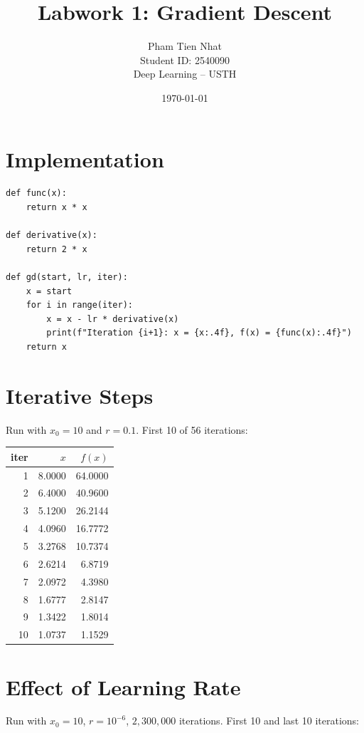 \documentclass[11pt,a4paper]{article}
\title{Labwork 1: Gradient Descent}
\author{Pham Tien Nhat \\ Student ID: 2540090 \\ Deep Learning -- USTH}
\date{\today}
\begin{document}
\maketitle

\section{Implementation}

\begin{verbatim}
def func(x):
    return x * x

def derivative(x):
    return 2 * x

def gd(start, lr, iter):
    x = start
    for i in range(iter):
        x = x - lr * derivative(x)
        print(f"Iteration {i+1}: x = {x:.4f}, f(x) = {func(x):.4f}")
    return x
\end{verbatim}

\section{Iterative Steps}
Run with $x_0=10$ and $r=0.1$. First 10 of 56 iterations:

\begin{table}[H]
\centering
\begin{tabular}{rrr}
\toprule
iter & $x$ & $f(x)$ \\
\midrule
1  & 8.0000 & 64.0000 \\
2  & 6.4000 & 40.9600 \\
3  & 5.1200 & 26.2144 \\
4  & 4.0960 & 16.7772 \\
5  & 3.2768 & 10.7374 \\
6  & 2.6214 & 6.8719  \\
7  & 2.0972 & 4.3980  \\
8  & 1.6777 & 2.8147  \\
9  & 1.3422 & 1.8014  \\
10 & 1.0737 & 1.1529  \\
\bottomrule
\end{tabular}
\end{table}

\section{Effect of Learning Rate}
Run with $x_0=10$, $r=10^{-6}$, $2{,}300{,}000$ iterations.
First 10 and last 10 iterations:
\end{document}
